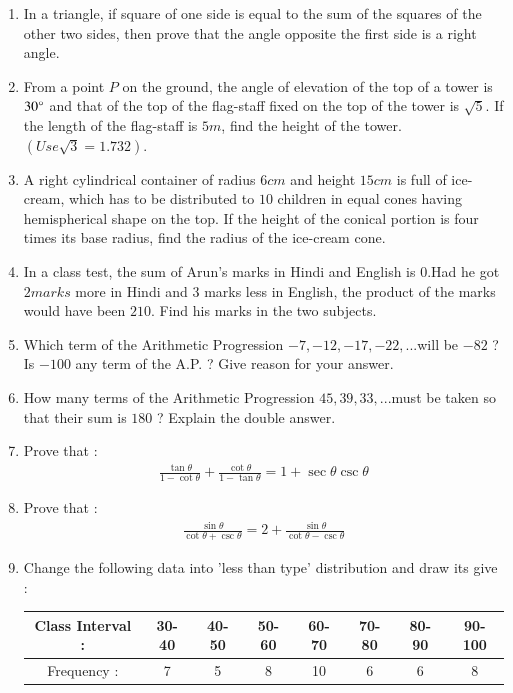 \documentclass[12pt,-letter paper]{article}
\begin{document}
\begin{enumerate}
\item In a triangle, if square of one side is equal to the sum of the squares of the other two sides, then prove that the angle opposite the first side is a right angle.

\item From a point $P$ on the ground, the angle of elevation of the top of a tower is $30\degree$ and that of the top of the flag-staff fixed on the top of the tower is $\sqrt{5}$. If the length of the flag-staff is $5 m$, find the height of the tower. $(Use \sqrt{3}= 1.732)$.

\item A right cylindrical container of radius $6 cm$ and height $15 cm$ is full of ice-cream, which has to be distributed to $10$ children in equal cones having hemispherical shape on the top. If the height of the conical portion is four times its base radius, find the radius of the ice-cream cone.

\item In a class test, the sum of Arun's marks in Hindi and English is $0$.Had he got $2 marks$ more in Hindi and $3$ marks less in English, the product of the marks would have been $210$. Find his marks in the two subjects.

\item Which term of the Arithmetic Progression $-7, -12, -17, -22, ... $will be $-82$ ? Is $-100$ any term of the A.P. ? Give reason for your answer.

\item How many terms of the Arithmetic Progression $45, 39, 33, ... $must be taken so that their sum is $180$ ? Explain the double answer.

\item Prove that :
\begin{align*}
\frac{\tan \theta}{1-\cot \theta} + \frac{\cot \theta}{1- \tan \theta} = 1+ \sec \theta  \csc  \theta   
\end{align*}

\item Prove that :
\begin{align*}
    \frac{\sin \theta}{\cot \theta + \csc \theta} = 2 + \frac{\sin \theta}{\cot \theta - \csc \theta}
\end{align*}

\item Change the following data into 'less than type' distribution and draw its give :
\begin{center}
 \begin{tabular}{|c | c | c | c| c | c | c | c|} 
 \hline
 Class Interval : & 30-40 & 40-50 & 50-60 & 60-70 & 70-80& 80-90 &90-100  \\ 
\hline
 Frequency : & 7 & 5 & 8 & 10 & 6 & 6 & 8 \\ 
 \hline
\end{tabular}
\end{center}


\end{enumerate}
\end{document}
